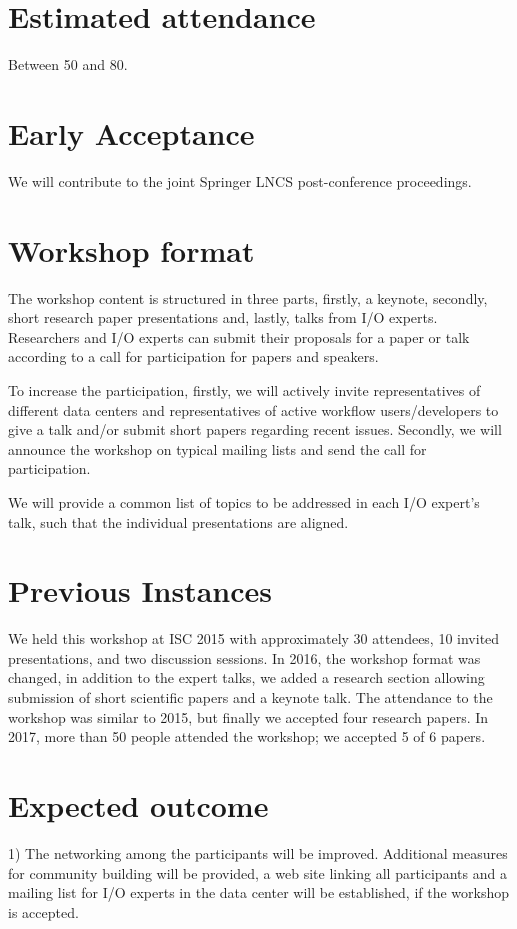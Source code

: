 \documentclass[a4paper,10pt]{article}
\begin{document}
\section{Estimated attendance}
Between 50 and 80.

\section{Early Acceptance}

We will contribute to the joint Springer LNCS post-conference proceedings.




\section{Workshop format}
The workshop content is structured in three parts,
firstly, a keynote, secondly, short research paper presentations and, lastly, talks from I/O experts.
Researchers and I/O experts can submit their proposals for a paper or talk according to a call for participation for papers and speakers.

To increase the participation, firstly, we will actively invite representatives of different data centers and representatives of active workflow users/developers to give a talk and/or submit short papers regarding recent issues.
Secondly, we will announce the workshop on typical mailing lists and send the call for participation.

We will provide a common list of topics to be addressed in each I/O expert's talk, such that the individual presentations are aligned.


\section{Previous Instances}
We held this workshop at ISC 2015 with approximately 30 attendees, 10 invited presentations, and two discussion sessions.
In 2016, the workshop format was changed, in addition to the expert talks, we added a research section allowing submission of short scientific papers and a keynote talk.
The attendance to the workshop was similar to 2015, but finally we accepted four research papers.
In 2017, more than 50 people attended the workshop; we accepted 5 of 6 papers.

\section{Expected outcome}
1) The networking among the participants will be improved.
Additional measures for community building will be provided, a web site linking all participants and a mailing list for I/O experts in the data center will be established, if the workshop is accepted.
\end{document}
